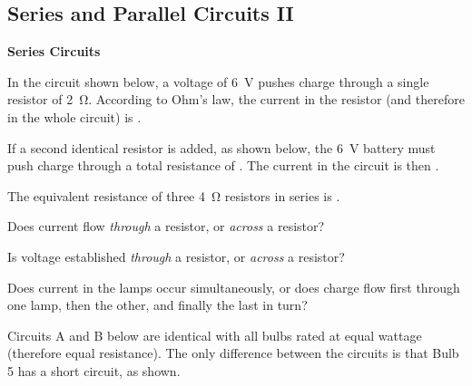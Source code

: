 \documentclass[answers]{exam}
\begin{document}
\clearpage


\subsection*{Series and Parallel Circuits II}

\textbf{Series Circuits}

\begin{questions}
\question 
In the circuit shown below, a voltage of \SI{6}{V} pushes charge through a single resistor of \SI{2}{\ohm}. According to Ohm's law, the current in the resistor (and therefore in the whole circuit) is \fillin[\SI{3}{A}].

\begin{center}
\end{center}

\question
If a second identical resistor is added, as shown below, the \SI{6}{V} battery must push charge through a total resistance of \fillin[\SI{6}{\ohm}].
The current in the circuit is then \fillin[\SI{1}{A}].

\begin{center}
\end{center}


\question
The equivalent resistance of three \SI{4}{\ohm} resistors in series is \fillin[\SI{12}{\ohm}].

\question
Does current flow \textit{through} a resistor, or \textit{across} a resistor? \fillin[through]

Is voltage established \textit{through} a resistor, or \textit{across} a resistor? \fillin[across]


\question
Does current in the lamps occur simultaneously, or does charge flow first through one lamp, then the other, and finally the last in turn?




\question 
Circuits A and B below are identical with all bulbs rated at equal wattage (therefore equal resistance). The only difference between the circuits is that Bulb 5 has a short circuit, as shown.


\end{questions}
\end{document}
